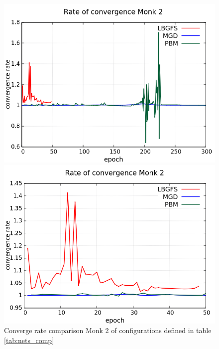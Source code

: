 \begin{figure}[H]
	\centering
	\begin{minipage}[t]{0.5\linewidth}
		\includegraphics[width=\linewidth]{data/Comparison/Monk2/Monk2_CR_standard.png}
	\end{minipage}%
	\begin{minipage}[t]{0.5\linewidth}
		\includegraphics[width=\linewidth]{data/Comparison/Monk2/Monk2_CR_zoom.png}
	\end{minipage}
	\caption{Converge rate comparison Monk 2 of configurations defined in table \ref{tab:nets_comp}}
	\label{CR-Monk2}
\end{figure}
